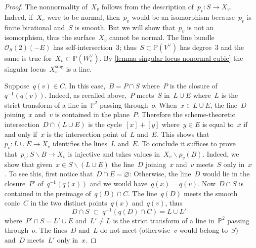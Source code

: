 \documentclass[a4paper]{amsart}
\newcommand{\bbP}{\mathbb{P}}
\newcommand{\cO}{\mathcal{O}}
\newcommand{\sing}{{\mathrm{sing}}}
\theoremstyle{plain}
\theoremstyle{definition}
\numberwithin{equation}{section}
\begin{document}
\begin{proof} The nonnormality of~$X_v$ follows from the description of~$p_v \colon S \to X_v$. Indeed, if~$X_v$ were to be normal, then~$p_v$ would be an isomorphism because~$p_v$ is finite birational and~$S$ is smooth. But we will show that~$p_v$ is not an isomorphism, thus the surface~$X_v$ cannot be normal. The line bundle~$\cO_{S}(2)(-E)$ has self-intersection~$3$; thus~$S \subset \bbP(V^\vee)$ has degree~$3$ and the same is true for~$X_v \subset \bbP(W_v^\vee)$. By \cref{lemma singular locus nonormal cubic} the singular locus~$X_v^\sing$ is a line. \medskip

Suppose~$q(v) \in C$. In this case,~$B = P \cap S$ where~$P$ is the closure of~$q^{-1}(q(v))$. Indeed, as recalled above,~$P$ meets~$S$ in~$L \cup E$ where~$L$ is the strict transform of a line in~$\bbP^2$ passing through~$o$. When~$x \in L \cup E$, the line~$D$ joining~$x$ and~$v$ is contained in the plane~$P$. Therefore the scheme-theoretic intersection~$D \cap (L \cup E)$ is the cycle~$[x] + [y]$ where~$y \in E$ is equal to~$x$ if and only if~$x$ is the intersection point of~$L$ and~$E$. This shows that~$p_v \colon L \cup E \to X_v$ identifies the lines~$L$ and~$E$. To conclude it suffices to prove that~$p_v \colon S \smallsetminus B \to X_v$ is injective and takes values in~$X_v \smallsetminus p_v(B)$. Indeed, we show that given~$x \in S \smallsetminus (L \cup E)$ the line~$D$ joining~$x$ and~$v$ meets~$S$ only in~$x$. To see this, first notice that~$D \cap E = \varnothing$: Otherwise, the line~$D$ would lie in the closure~$P'$ of~$q^{-1}(q(x))$ and we would have~$q(x) = q(v)$.  Now~$D \cap S$ is contained in the preimage of~$q(D) \cap C$. The line~$q(D)$ meets the smooth conic~$C$ in the two distinct points~$q(x)$ and~$q(v)$, thus
\[ D \cap S \; \subset \; q^{-1}(q(D) \cap C) = L \cup L'\]
where~$P' \cap S = L' \cup E$ and~$L' \neq L$ is the strict transform of a line in~$\bbP^2$ passing through~$o$. The lines~$D$ and~$L$ do not meet (otherwise~$v$ would belong to~$S$) and~$D$ meets~$L'$ only in~$x$.\medskip


\end{proof}
\end{document}
